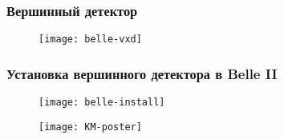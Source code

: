 \begin{frame}
    \frametitle{Вершинный детектор}
    \begin{figure}
        \begin{centering}
            \texttt{[image: belle-vxd]}
        \end{centering}
    \end{figure}
\end{frame}
\begin{frame}
    \frametitle{Установка вершинного детектора в Belle II}
    \begin{figure}
        \begin{centering}
            \texttt{[image: belle-install]}
        \end{centering}
    \end{figure}
\end{frame}
	
\begin{frame}
    \begin{figure}
        \begin{centering}
            \texttt{[image: KM-poster]}
        \end{centering}
    \end{figure}
\end{frame}

